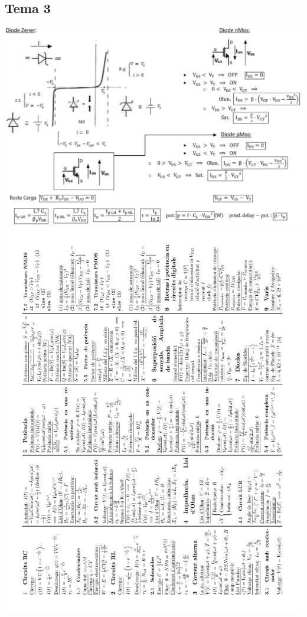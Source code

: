 \documentclass[12pt]{article}
\begin{document}
\begin{multicols}{2}
\subsection*{Tema 3}
\includegraphics[width=\linewidth]{Auxiliar/t3fib.pdf}
\includegraphics[width=14.5cm]{Auxiliar/t2i3_latex.pdf}

\end{multicols}
\end{document}
